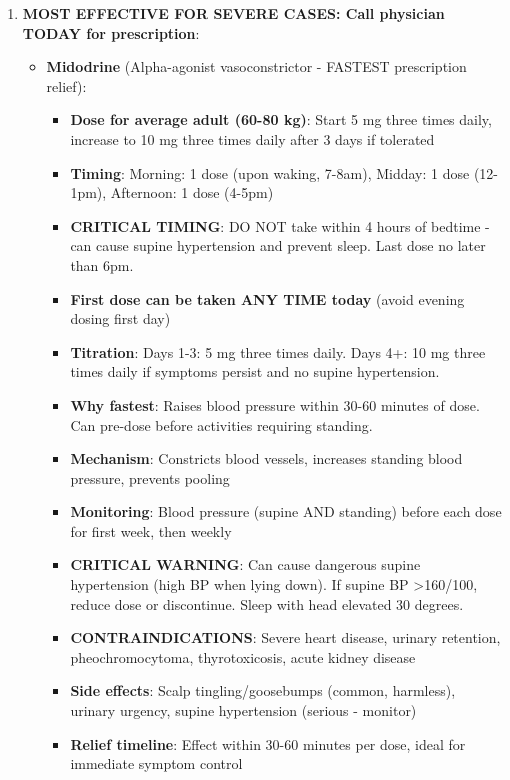 \begin{enumerate}
    \item \textbf{MOST EFFECTIVE FOR SEVERE CASES: Call physician TODAY for prescription}:
    \begin{itemize}
        \item \textbf{Midodrine} (Alpha-agonist vasoconstrictor - FASTEST prescription relief):
        \begin{itemize}
            \item \textbf{Dose for average adult (60-80 kg)}: Start 5 mg three times daily, increase to 10 mg three times daily after 3 days if tolerated
            \item \textbf{Timing}: Morning: 1 dose (upon waking, 7-8am), Midday: 1 dose (12-1pm), Afternoon: 1 dose (4-5pm)
            \item \textbf{CRITICAL TIMING}: DO NOT take within 4 hours of bedtime - can cause supine hypertension and prevent sleep. Last dose no later than 6pm.
            \item \textbf{First dose can be taken ANY TIME today} (avoid evening dosing first day)
            \item \textbf{Titration}: Days 1-3: 5 mg three times daily. Days 4+: 10 mg three times daily if symptoms persist and no supine hypertension.
            \item \textbf{Why fastest}: Raises blood pressure within 30-60 minutes of dose. Can pre-dose before activities requiring standing.
            \item \textbf{Mechanism}: Constricts blood vessels, increases standing blood pressure, prevents pooling
            \item \textbf{Monitoring}: Blood pressure (supine AND standing) before each dose for first week, then weekly
            \item \textbf{CRITICAL WARNING}: Can cause dangerous supine hypertension (high BP when lying down). If supine BP >160/100, reduce dose or discontinue. Sleep with head elevated 30 degrees.
            \item \textbf{CONTRAINDICATIONS}: Severe heart disease, urinary retention, pheochromocytoma, thyrotoxicosis, acute kidney disease
            \item \textbf{Side effects}: Scalp tingling/goosebumps (common, harmless), urinary urgency, supine hypertension (serious - monitor)
            \item \textbf{Relief timeline}: Effect within 30-60 minutes per dose, ideal for immediate symptom control
        \end{itemize}


\end{itemize}
\end{enumerate}
